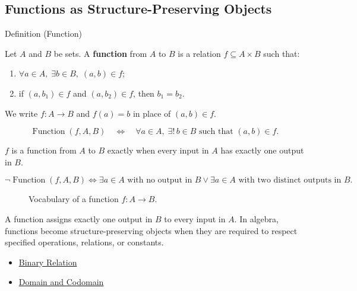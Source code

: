\subsection*{Functions as Structure-Preserving Objects}
\label{subsec:functions-as-structure-preserving-objects}

\begin{definitionbox}{Definition (Function)}
\begin{definition}[Function]
\label{def:alg-function}
Let $A$ and $B$ be sets.
A \textbf{function} from $A$ to $B$ is a relation $f \subseteq A \times B$
such that:
\begin{enumerate}[label=(\roman*)]
  \item $\forall a \in A,\; \exists b \in B,\; (a,b) \in f$;
  \item if $(a,b_1) \in f$ and $(a,b_2) \in f$, then $b_1=b_2$.
\end{enumerate}
We write $f:A\to B$ and $f(a)=b$ in place of $(a,b)\in f$.
\end{definition}
\end{definitionbox}

\begin{remark*}
\[
\operatorname{Function}(f,A,B)
\quad\Longleftrightarrow\quad
\forall a \in A,\; \exists!\, b \in B \text{ such that } (a,b)\in f.
\]
\end{remark*}

\begin{remark*}
$f$ is a function from $A$ to $B$ exactly when every input in $A$ has exactly
one output in $B$.
\end{remark*}

\begin{remark*}
\[
\neg\operatorname{Function}(f,A,B)
\Longleftrightarrow
\exists a\in A\text{ with no output in }B
\lor
\exists a\in A\text{ with two distinct outputs in }B.
\]
\end{remark*}

\begin{figure}[htbp]
  \centering
  
  \caption{Vocabulary of a function $f:A\to B$.}
  \label{fig:function-vocabulary}
\end{figure}

\begin{remark*}[Interpretation]
A function assigns exactly one output in $B$ to every input in $A$.
In algebra, functions become structure-preserving objects when they are
required to respect specified operations, relations, or constants.
\end{remark*}

\begin{dependencies}
\begin{itemize}
  \item \hyperref[def:binary-relation]{Binary Relation}
  \item \hyperref[def:domain-codomain]{Domain and Codomain}
\end{itemize}
\end{dependencies}
